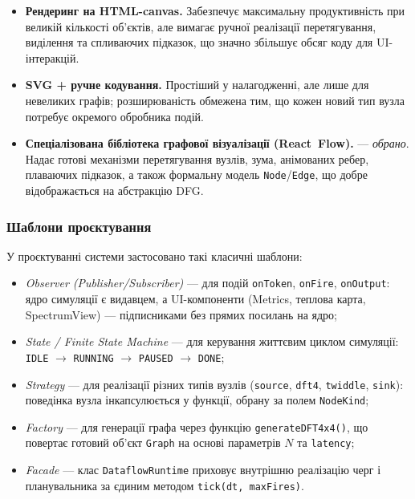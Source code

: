 \begin{itemize}
  \item \textbf{Рендеринг на HTML-canvas.} Забезпечує максимальну
        продуктивність при великій кількості об'єктів, але вимагає
        ручної реалізації перетягування, виділення та спливаючих
        підказок, що значно збільшує обсяг коду для UI-інтеракцій.
  \item \textbf{SVG + ручне кодування.} Простіший у налагодженні,
        але лише для невеликих графів; розширюваність обмежена
        тим, що кожен новий тип вузла потребує окремого обробника
        подій.
  \item \textbf{Спеціалізована бібліотека графової візуалізації
        (React~Flow).} --- \emph{обрано}. Надає готові механізми
        перетягування вузлів, зума, анімованих ребер, плаваючих
        підказок, а також формальну модель \texttt{Node}/\texttt{Edge},
        що добре відображається на абстракцію DFG.
\end{itemize}

\subsubsection*{Шаблони проєктування}

У проєктуванні системи застосовано такі класичні шаблони:

\begin{itemize}
  \item \textit{Observer (Publisher/Subscriber)} --- для подій
        \texttt{onToken}, \texttt{onFire}, \texttt{onOutput}:
        ядро симуляції є видавцем, а UI-компоненти
        (Metrics, теплова карта, SpectrumView) --- підписниками
        без прямих посилань на ядро;
  \item \textit{State / Finite State Machine} --- для керування
        життєвим циклом симуляції: \texttt{IDLE} $\to$
        \texttt{RUNNING} $\to$ \texttt{PAUSED} $\to$ \texttt{DONE};
  \item \textit{Strategy} --- для реалізації різних типів вузлів
        (\texttt{source}, \texttt{dft4}, \texttt{twiddle},
        \texttt{sink}): поведінка вузла інкапсулюється у функції,
        обрану за полем \texttt{NodeKind};
  \item \textit{Factory} --- для генерації графа через функцію
        \texttt{generateDFT4x4()}, що повертає готовий об'єкт
        \texttt{Graph} на основі параметрів $N$ та \texttt{latency};
  \item \textit{Facade} --- клас \texttt{DataflowRuntime} приховує
        внутрішню реалізацію черг і планувальника за єдиним методом
        \texttt{tick(dt, maxFires)}.
\end{itemize}

